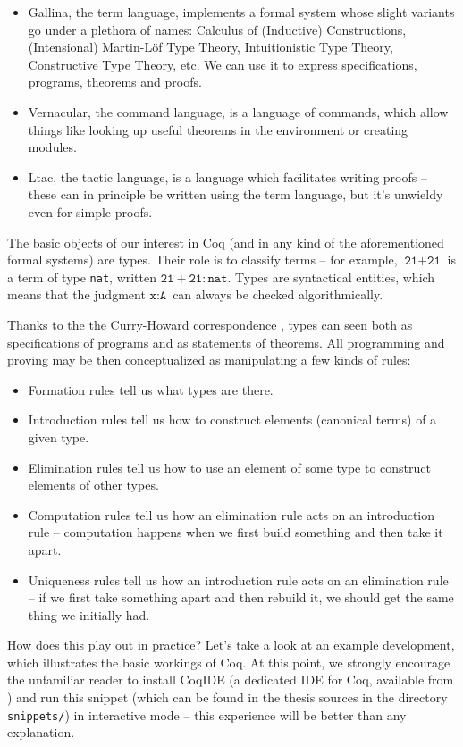 \documentclass[declaration,inz,english,shortabstract]{iithesis}
\newcommand{\m}[1]{\texttt{#1}}
\begin{document}
\begin{itemize}
    \item Gallina, the term language, implements a formal system whose slight variants go under a plethora of names: Calculus of (Inductive) Constructions, (Intensional) Martin-L\"of Type Theory, Intuitionistic Type Theory, Constructive Type Theory, etc. We can use it to express specifications, programs, theorems and proofs.
    \item Vernacular, the command language, is a language of commands, which allow things like looking up useful theorems in the environment or creating modules.
    \item Ltac, the tactic language, is a language which facilitates writing proofs -- these can in principle be written using the term language, but it's unwieldy even for simple proofs.
\end{itemize}

The basic objects of our interest in Coq (and in any kind of the aforementioned formal systems) are types. Their role is to classify terms -- for example, $\m{21} + \m{21}$ is a term of type \m{nat}, written $\m{21} + \m{21} : \m{nat}$. Types are syntactical entities, which means that the judgment $\m{x} : \m{A}$ can always be checked algorithmically.

Thanks to the the Curry-Howard correspondence \cite{CurryHoward}, types can seen both as specifications of programs and as statements of theorems. All programming and proving may be then conceptualized as manipulating a few kinds of rules:

\begin{itemize}
    \item Formation rules tell us what types are there.
    \item Introduction rules tell us how to construct elements (canonical terms) of a given type.
    \item Elimination rules tell us how to use an element of some type to construct elements of other types.
    \item Computation rules tell us how an elimination rule acts on an introduction rule -- computation happens when we first build something and then take it apart.
    \item Uniqueness rules tell us how an introduction rule acts on an elimination rule -- if we first take something apart and then rebuild it, we should get the same thing we initially had.
\end{itemize}

How does this play out in practice? Let's take a look at an example development, which illustrates the basic workings of Coq. At this point, we strongly encourage the unfamiliar reader to install CoqIDE (a dedicated IDE for Coq, available from \cite{Coq}) and run this snippet (which can be found in the thesis sources in the directory \m{snippets/}) in interactive mode -- this experience will be better than any explanation.
\end{document}
